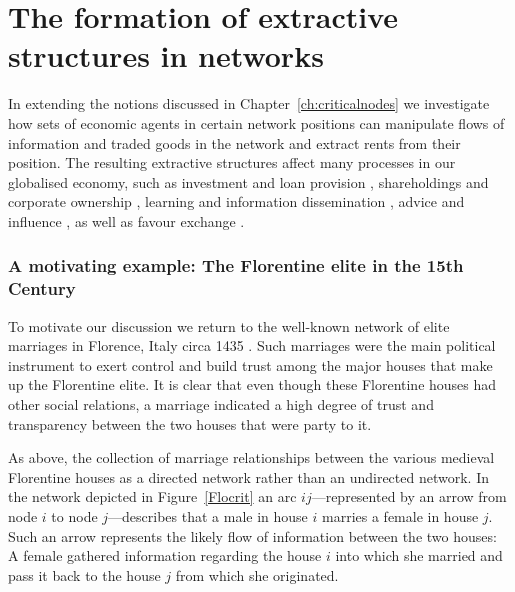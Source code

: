 \chapter{The formation of extractive structures in networks}
\label{ch:blocks}

In extending the notions discussed in Chapter~\ref{ch:criticalnodes} we investigate how sets of economic agents in certain network positions can manipulate flows of information and traded goods in the network and extract rents from their position. The resulting extractive structures affect many processes in our globalised economy, such as investment and loan provision \citep{Gai2010, ElliotGolubJackson2014}, shareholdings and corporate ownership \citep{Vitali2011}, learning and information dissemination \citep{GolubJackson2010}, advice and influence \citep{Krackhardt1987}, as well as favour exchange \citep{Jackson2012}.

\subsection{A motivating example: The Florentine elite in the 15th Century}

To motivate our discussion we return to the well-known network of elite marriages in Florence, Italy circa 1435 \citep{Kent1978,Padgett1993}. Such marriages were the main political instrument to exert control and build trust among the major houses that make up the Florentine elite. It is clear that even though these Florentine houses had other social relations, a marriage indicated a high degree of trust and transparency between the two houses that were party to it.

As above, the collection of marriage relationships between the various medieval Florentine houses as a directed network rather than an undirected network. In the network depicted in Figure~\ref{Flocrit} an arc $ij$---represented by an arrow from node $i$ to node $j$---describes that a male in house $i$ marries a female in house $j$. Such an arrow represents the likely flow of information between the two houses: A female gathered information regarding the house $i$ into which she married and pass it back to the house $j$ from which she originated.

